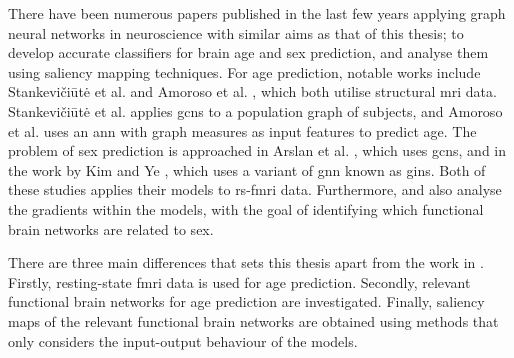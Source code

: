 
There have been numerous papers published in the last few years applying graph neural networks in neuroscience with similar aims as that of this thesis; to develop accurate classifiers for brain age and sex prediction, and analyse them using saliency mapping techniques. For age prediction, notable works include Stankevičiūtė et al. \cite{stankeviciute} and Amoroso et al. \cite{amoroso_multiplex_age}, which both utilise structural \acrshort{mri} data. Stankevičiūtė et al. applies \acrshort{gcn}s to a population graph of subjects, and Amoroso et al. uses an \acrshort{ann} with graph measures as input features to predict age. The problem of sex prediction is approached in Arslan et al. \cite{arslan}, which uses \acrshort{gcn}s, and in the work by Kim and Ye \cite{understanding_gnn}, which uses a variant of \acrshort{gnn} known as \acrshort{gin}s. Both of these studies applies their models to \acrshort{rs-fmri} data. Furthermore, \cite{arslan} and \cite{understanding_gnn} also analyse the gradients within the models, with the goal of identifying which functional brain networks are related to sex. 

There are three main differences that sets this thesis apart from the work in \cite{stankeviciute, amoroso_multiplex_age, arslan, understanding_gnn}. Firstly, resting-state \acrshort{fmri} data is used for age prediction. Secondly, relevant functional brain networks for age prediction are investigated. Finally, saliency maps of the relevant functional brain networks are obtained using methods that only considers the input-output behaviour of the models. 

